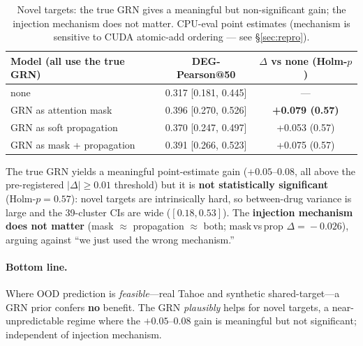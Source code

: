 \documentclass[11pt]{article}
\begin{document}
\begin{table}[h]\centering
\begin{tabular}{lcc}
\toprule
Model (all use the true GRN) & DEG-Pearson@50 & $\Delta$ vs none (Holm-$p$) \\
\midrule
none & 0.317 [0.181, 0.445] & --- \\
GRN as attention mask & 0.396 [0.270, 0.526] & \textbf{+0.079 (0.57)} \\
GRN as soft propagation & 0.370 [0.247, 0.497] & +0.053 (0.57) \\
GRN as mask + propagation & 0.391 [0.266, 0.523] & +0.075 (0.57) \\
\bottomrule
\end{tabular}
\caption{Novel targets: the true GRN gives a meaningful but non-significant gain; the injection
mechanism does not matter. CPU-eval point estimates (mechanism is sensitive to CUDA atomic-add
ordering — see \S\ref{sec:repro}).}
\end{table}

The true GRN yields a meaningful point-estimate gain ($+0.05$--$0.08$, all above the pre-registered
$|\Delta|\!\geq\!0.01$ threshold) but it is \textbf{not statistically significant}
(Holm-$p\!=\!0.57$): novel targets are intrinsically hard, so between-drug variance is large and
the 39-cluster CIs are wide ($[0.18, 0.53]$). The \textbf{injection mechanism does not matter}
(mask $\approx$ propagation $\approx$ both; mask\,vs\,prop $\Delta\!=\!-0.026$), arguing against
``we just used the wrong mechanism.''

\paragraph{Bottom line.} Where OOD prediction is \emph{feasible}---real Tahoe and synthetic
shared-target---a GRN prior confers \textbf{no} benefit. The GRN \emph{plausibly} helps for novel
targets, a near-unpredictable regime where the $+0.05$--$0.08$ gain is meaningful but not
significant; independent of injection mechanism.
\end{document}

